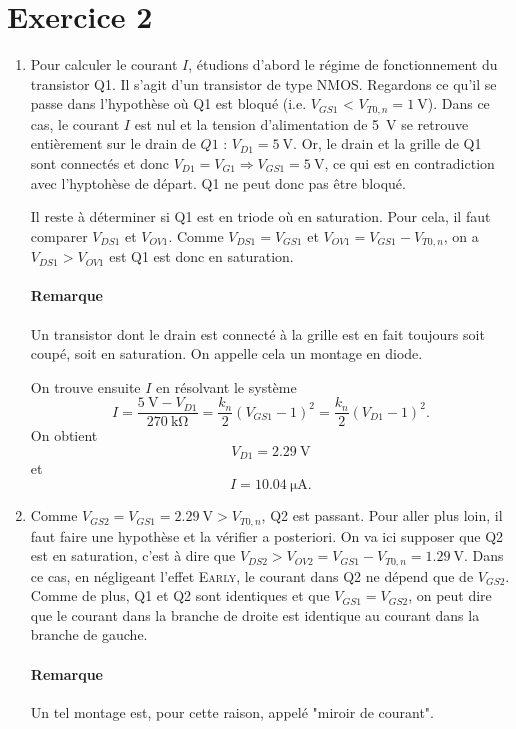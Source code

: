 \section{Exercice 2}
\begin{enumerate}
	\item Pour calculer le courant $I$, étudions d'abord le régime de fonctionnement
	du transistor Q1. Il s'agit d'un transistor de type NMOS. Regardons ce qu'il se
	passe dans l'hypothèse où Q1 est bloqué (i.e. $V_{GS1}$ < $V_{T0,n} = \SI{1}{\volt}$).
	Dans ce cas, le courant $I$ est nul et la tension d'alimentation de \SI{5}{\volt} se
	retrouve entièrement sur le drain de $Q1$ : $V_{D1} = \SI{5}{\volt}$. Or, le drain
	et la grille de Q1 sont connectés et donc $V_{D1} = V_{G1} \Rightarrow V_{GS1}
	= \SI{5}{\volt}$, ce qui est en contradiction avec l'hyptohèse de départ. Q1 ne peut
	donc pas être bloqué.
	
	Il reste à déterminer si Q1 est en triode où en saturation. Pour cela, il faut
	comparer $V_{DS1}$ et $V_{OV1}$. Comme $V_{DS1} = V_{GS1}$ et $V_{OV1} = V_{GS1} -
	V_{T0,n}$, on a $V_{DS1} > V_{OV1}$ est Q1 est donc en saturation.
	\paragraph*{Remarque} Un transistor dont le drain est connecté à la grille est en
	fait toujours soit coupé, soit en saturation. On appelle cela un montage en diode.
	
	On trouve ensuite $I$ en résolvant le système	
	\[ I = \frac{\SI{5}{\volt}-V_{D1}}{\SI{270}{\kilo\ohm}} = \frac{k_n}{2}(V_{GS1} - 1)^2 =
        \frac{k_n}{2}(V_{D1} - 1)^2.\]	
	On obtient
	\[ V_{D1} = \SI{2.29}{\volt} \]
	et
	\[ I = \SI{10.04}{\micro\ampere}. \]
	
	\item Comme $V_{GS2}  = V_{GS1} = \SI{2.29}{\volt} > V_{T0,n}$, Q2 est passant. Pour aller
	plus loin, il faut faire une hypothèse et la vérifier a posteriori. On va ici supposer
	que Q2 est en saturation, c'est à dire que $V_{DS2} > V_{OV2} = V_{GS1} - V_{T0,n} =
	\SI{1.29}{\volt}$. Dans ce cas, en négligeant l'effet \textsc{Early}, le courant dans Q2
	ne dépend que de $V_{GS2}$. Comme de plus, Q1 et Q2 sont identiques et que $V_{GS1} = V_{GS2}$,
	on peut dire que le courant dans la branche de droite est identique au courant dans la branche
	de gauche.
	\paragraph{Remarque} Un tel montage est, pour cette raison, appelé "miroir de courant".
	

\end{enumerate}
